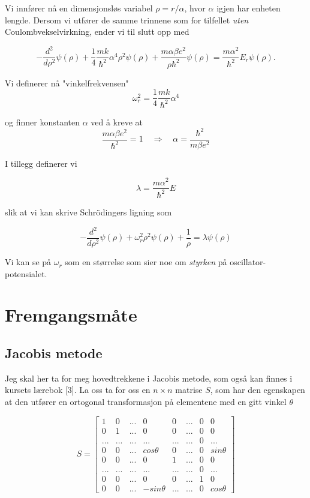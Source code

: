 \documentclass{article}
\begin{document}
Vi innfører nå en dimensjonsløs variabel $\rho = r/ \alpha$, hvor $\alpha$ igjen har enheten lengde. Dersom vi utfører de samme trinnene som for tilfellet \textit{uten} Coulombvekselvirkning, ender vi til slutt opp med

\begin{equation*}
  -\frac{d^2}{d\rho^2} \psi(\rho) 
       + \frac{1}{4}\frac{mk}{\hbar^2} \alpha^4\rho^2\psi(\rho)+\frac{m\alpha \beta e^2}{\rho\hbar^2}\psi(\rho)  = 
\frac{m\alpha^2}{\hbar^2}E_r \psi(\rho) .
\end{equation*}

Vi definerer nå "vinkelfrekvensen"
\[\omega_r^2 = \frac{1}{4}\frac{mk}{\hbar ^2}\alpha^4 \]

og finner konstanten $\alpha$ ved å kreve at 
\[\frac{m\alpha \beta e^2}{\hbar ^2} = 1 \quad \Rightarrow \quad \alpha = \frac{\hbar ^2}{m\beta e^2}  \]

I tillegg definerer vi 

\[\lambda = \frac{m\alpha ^2}{\hbar ^2}E \]

slik at vi kan skrive Schrödingers ligning som

\begin{equation*}
  -\frac{d^2}{d\rho^2} \psi(\rho) + \omega_r^2\rho^2\psi(\rho) +\frac{1}{\rho} = \lambda \psi(\rho)
\end{equation*}

Vi kan se på $\omega_r$ som en størrelse som sier noe om \textit{styrken} på oscillator-potensialet.


\section{Fremgangsmåte}
\subsection{Jacobis metode}
Jeg skal her ta for meg hovedtrekkene i Jacobis metode, som også kan finnes i kursets lærebok [3].
La oss ta for oss en $n \times n$ matrise $S$, som har den egenskapen at den utfører en ortogonal transformasjon på elementene med en gitt vinkel $\theta$

\[S = \begin{bmatrix} 1&0 &... &0 &0 &... &0 &0 \\ 
0& 1 & ... & 0 & 0 &... &0 &0 \\
 ...& ... & ... & ... & ... & ... & 0 &... \\ 
 0& 0 & ... & cos\theta &0 &... &0 &sin\theta \\
  0& 0 & ... & 0 & 1 & ... & 0 & 0\\ 
  ...& ... & ... & ... & ... & ... & 0 &... \\ 
  0 & 0 & ... & 0 & 0 & ... & 1 & 0\\
   0 & 0 & ... & -sin\theta & ... & ... & 0 & cos\theta \end{bmatrix}\]
\end{document}
